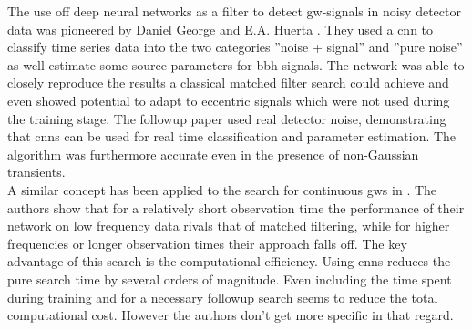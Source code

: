 The use off deep neural networks as a filter to detect \gls{gw}-signals in noisy detector data was pioneered by Daniel George and E.A. Huerta \cite{original_deep_filtering}. They used a \gls{cnn} to classify time series data into the two categories ''noise + signal'' and ''pure noise'' as well estimate some source parameters for \gls{bbh} signals. The network was able to closely reproduce the results a classical matched filter search could achieve and even showed potential to adapt to eccentric signals which were not used during the training stage. The followup paper \cite{huerta_parameter_estimation} used real detector noise, demonstrating that \gls{cnns} can be used for real time classification and parameter estimation. The algorithm was furthermore accurate even in the presence of non-Gaussian transients.\\
A similar concept has been applied to the search for continuous \gls{gw}s in \cite{paper_christoph}. The authors show that for a relatively short observation time the performance of their network on low frequency data rivals that of matched filtering, while for higher frequencies or longer observation times their approach falls off. The key advantage of this search is the computational efficiency. Using \gls{cnns} reduces the pure search time by several orders of magnitude. Even including the time spent during training and for a necessary followup search seems to reduce the total computational cost. However the authors don't get more specific in that regard.\\

